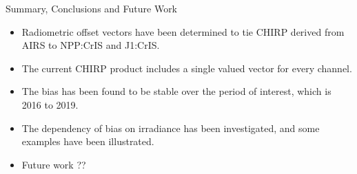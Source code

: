 \documentclass[10pt,t]{beamer}
\begin{document}
\begin{frame}{Summary, Conclusions and Future Work}

  \begin{itemize}
  \item Radiometric offset vectors have been determined to tie CHIRP derived from AIRS to NPP:CrIS and J1:CrIS.
  \item The current CHIRP product includes a single valued vector for every channel.
  \item The bias has been found to be stable over the period of interest, which is 2016 to 2019.
  \item The dependency of bias on irradiance has been investigated, and some examples have been illustrated.
  \item Future work ??
    
  \end{itemize}
  

\end{frame}


\end{document}
